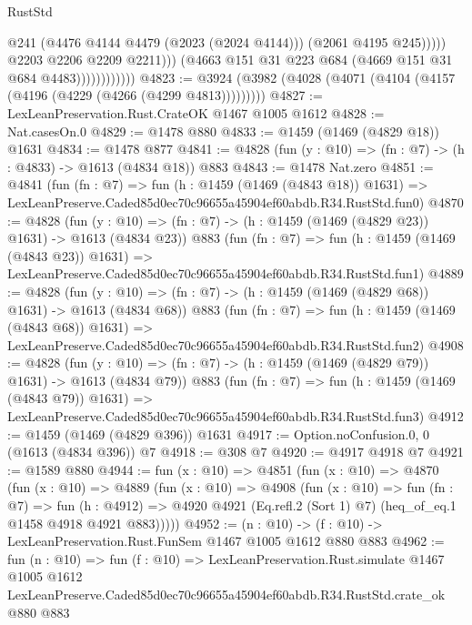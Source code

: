 \begin{lexlean}{RustStd}
\begin{coremodule}
                                      @241
                                      (@4476 @4144 @4479 (@2023 (@2024 @4144)))
                                      (@2061 @4195 @245)))))
                              @2203
                              @2206
                              @2209
                              @2211)))
                        (@4663 @151 @31 @223 @684 (@4669 @151 @31 @684 @4483))))))))))))
@4823 := @3924 (@3982 (@4028 (@4071 (@4104 (@4157 (@4196 (@4229 (@4266 (@4299 @4813)))))))))
@4827 := LexLeanPreservation.Rust.CrateOK @1467 @1005 @1612
@4828 := Nat.casesOn.{0}
@4829 := @1478 @880
@4833 := @1459 (@1469 (@4829 @18)) @1631
@4834 := @1478 @877
@4841 := @4828 (fun (y : @10) => (fn : @7) -> (h : @4833) -> @1613 (@4834 @18)) @883
@4843 := @1478 Nat.zero
@4851 := @4841
    (fun (fn : @7) =>
    fun (h : @1459 (@1469 (@4843 @18)) @1631) =>
    LexLeanPreserve.Caded85d0ec70c96655a45904ef60abdb.R34.RustStd.fun0)
@4870 := @4828
    (fun (y : @10) => (fn : @7) -> (h : @1459 (@1469 (@4829 @23)) @1631) -> @1613 (@4834 @23))
    @883
    (fun (fn : @7) =>
    fun (h : @1459 (@1469 (@4843 @23)) @1631) =>
    LexLeanPreserve.Caded85d0ec70c96655a45904ef60abdb.R34.RustStd.fun1)
@4889 := @4828
    (fun (y : @10) => (fn : @7) -> (h : @1459 (@1469 (@4829 @68)) @1631) -> @1613 (@4834 @68))
    @883
    (fun (fn : @7) =>
    fun (h : @1459 (@1469 (@4843 @68)) @1631) =>
    LexLeanPreserve.Caded85d0ec70c96655a45904ef60abdb.R34.RustStd.fun2)
@4908 := @4828
    (fun (y : @10) => (fn : @7) -> (h : @1459 (@1469 (@4829 @79)) @1631) -> @1613 (@4834 @79))
    @883
    (fun (fn : @7) =>
    fun (h : @1459 (@1469 (@4843 @79)) @1631) =>
    LexLeanPreserve.Caded85d0ec70c96655a45904ef60abdb.R34.RustStd.fun3)
@4912 := @1459 (@1469 (@4829 @396)) @1631
@4917 := Option.noConfusion.{0, 0} (@1613 (@4834 @396)) @7
@4918 := @308 @7
@4920 := @4917 @4918 @7
@4921 := @1589 @880
@4944 := fun (x : @10) =>
  @4851
    (fun (x : @10) =>
    @4870
      (fun (x : @10) =>
      @4889
        (fun (x : @10) =>
        @4908
          (fun (x : @10) =>
          fun (fn : @7) =>
          fun (h : @4912) =>
          @4920 @4921 (Eq.refl.{2} (Sort 1) @7) (heq_of_eq.{1} @1458 @4918 @4921 @883)))))
@4952 := (n : @10) -> (f : @10) -> LexLeanPreservation.Rust.FunSem @1467 @1005 @1612 @880 @883
@4962 := fun (n : @10) =>
  fun (f : @10) =>
  LexLeanPreservation.Rust.simulate
    @1467
    @1005
    @1612
    LexLeanPreserve.Caded85d0ec70c96655a45904ef60abdb.R34.RustStd.crate_ok
    @880
    @883
\end{coremodule}
\end{lexlean}
